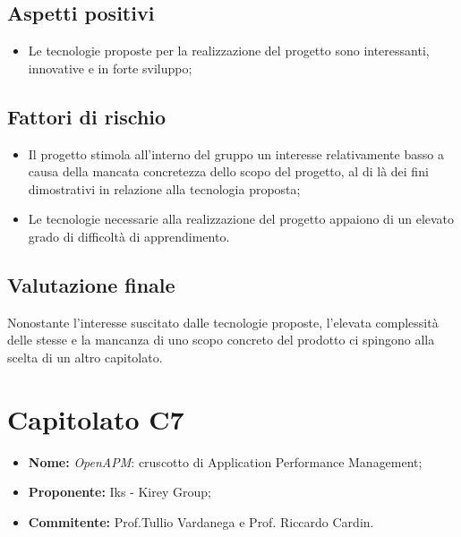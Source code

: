 \documentclass[openany,12pt,a4paper]{report}
\begin{document}
	\subsection{Aspetti positivi}
	
	\begin{itemize}
		\item Le tecnologie proposte per la realizzazione del progetto sono interessanti, innovative e in forte sviluppo;
	\end{itemize}
	
	\subsection{Fattori di rischio}
	
	\begin{itemize}
		\item Il progetto stimola all'interno del gruppo un interesse relativamente basso a causa della mancata concretezza dello scopo del progetto, al di là dei fini dimostrativi in relazione alla tecnologia proposta;
		
		\item Le tecnologie necessarie alla realizzazione del progetto appaiono di un elevato grado di difficoltà di apprendimento.
	\end{itemize}
	
	\subsection{Valutazione finale}
	
	Nonostante l'interesse suscitato dalle tecnologie proposte, l'elevata complessità delle stesse e la mancanza di uno scopo concreto del prodotto ci spingono alla scelta di un altro capitolato.
	
	
	\section{Capitolato C7}
	
	\begin{itemize}
		\item \textbf{Nome:} \textit{OpenAPM}: cruscotto di Application Performance Management;
		\item \textbf{Proponente:} Iks - Kirey Group;
		\item \textbf{Commitente:} Prof.Tullio Vardanega e Prof. Riccardo Cardin.
	\end{itemize}
	
\end{document}
